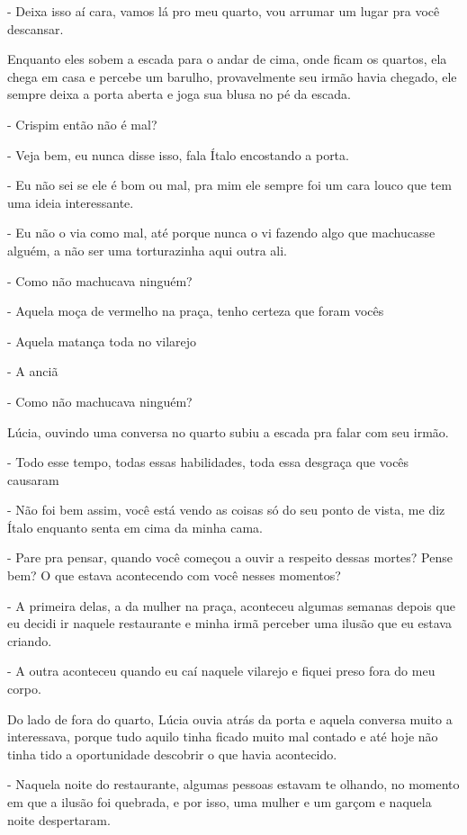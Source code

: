 - Deixa isso aí cara, vamos lá pro meu quarto, vou arrumar um lugar pra você descansar.

Enquanto eles sobem a escada para o andar de cima, onde ficam os quartos, ela chega em casa e percebe um barulho, provavelmente seu irmão havia chegado, ele sempre deixa a porta aberta e joga sua blusa no pé da escada.

- Crispim então não é mal?

- Veja bem, eu nunca disse isso, fala Ítalo encostando a porta.

- Eu não sei se ele é bom ou mal, pra mim ele sempre foi um cara louco que tem uma ideia interessante.

- Eu não o via como mal, até porque nunca o vi fazendo algo que machucasse alguém, a não ser uma torturazinha aqui outra ali.

- Como não machucava ninguém?

- Aquela moça de vermelho na praça, tenho certeza que foram vocês

- Aquela matança toda no vilarejo

- A anciã

- Como não machucava ninguém?

Lúcia, ouvindo uma conversa no quarto subiu a escada pra falar com seu irmão.

- Todo esse tempo, todas essas habilidades, toda essa desgraça que vocês causaram

- Não foi bem assim, você está vendo as coisas só do seu ponto de vista, me diz Ítalo enquanto senta em cima da minha cama.

- Pare pra pensar, quando você começou a ouvir a respeito dessas mortes? Pense bem? O que estava acontecendo com você nesses momentos?

- A primeira delas, a da mulher na praça, aconteceu algumas semanas depois que eu decidi ir naquele restaurante e minha irmã perceber uma ilusão que eu estava criando.

- A outra aconteceu quando eu caí naquele vilarejo e fiquei preso fora do meu corpo.

Do lado de fora do quarto, Lúcia ouvia atrás da porta e aquela conversa muito a interessava, porque tudo aquilo tinha ficado muito mal contado e até hoje não tinha tido a oportunidade descobrir o que havia acontecido.

- Naquela noite do restaurante, algumas pessoas estavam te olhando, no momento em que a ilusão foi quebrada, e por isso, uma mulher e um garçom e naquela noite despertaram.

